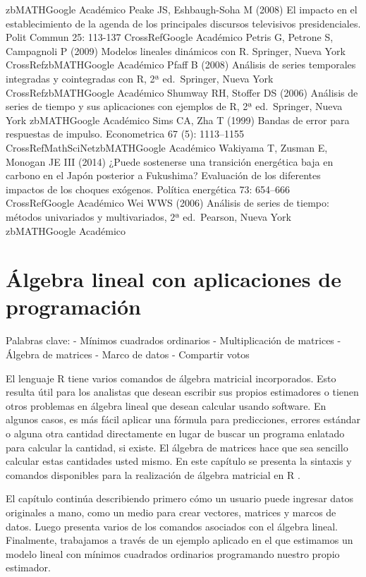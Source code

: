 \documentclass[
]{book}
\begin{document}
zbMATHGoogle Académico
Peake JS, Eshbaugh-Soha M (2008) El impacto en el establecimiento de la agenda de los principales discursos televisivos presidenciales. Polit Commun 25: 113-137
CrossRefGoogle Académico
Petris G, Petrone S, Campagnoli P (2009) Modelos lineales dinámicos con R. Springer, Nueva York
CrossRefzbMATHGoogle Académico
Pfaff B (2008) Análisis de series temporales integradas y cointegradas con R, 2ª ed.~Springer, Nueva York
CrossRefzbMATHGoogle Académico
Shumway RH, Stoffer DS (2006) Análisis de series de tiempo y sus aplicaciones con ejemplos de R, 2ª ed.~Springer, Nueva York
zbMATHGoogle Académico
Sims CA, Zha T (1999) Bandas de error para respuestas de impulso. Econometrica 67 (5): 1113--1155
CrossRefMathSciNetzbMATHGoogle Académico
Wakiyama T, Zusman E, Monogan JE III (2014) ¿Puede sostenerse una transición energética baja en carbono en el Japón posterior a Fukushima? Evaluación de los diferentes impactos de los choques exógenos. Política energética 73: 654--666
CrossRefGoogle Académico
Wei WWS (2006) Análisis de series de tiempo: métodos univariados y multivariados, 2ª ed.~Pearson, Nueva York
zbMATHGoogle Académico

\hypertarget{uxc1lgebralinealconaplicacionesdeprogramaciuxf3n}{%
\chapter{Álgebra lineal con aplicaciones de programación}\label{uxc1lgebralinealconaplicacionesdeprogramaciuxf3n}}

Palabras clave:
- Mínimos cuadrados ordinarios
- Multiplicación de matrices
- Álgebra de matrices
- Marco de datos
- Compartir votos

El lenguaje R tiene varios comandos de álgebra matricial incorporados. Esto resulta útil para los analistas que desean escribir sus propios estimadores o tienen otros problemas en álgebra lineal que desean calcular usando software. En algunos casos, es más fácil aplicar una fórmula para predicciones, errores estándar o alguna otra cantidad directamente en lugar de buscar un programa enlatado para calcular la cantidad, si existe. El álgebra de matrices hace que sea sencillo calcular estas cantidades usted mismo. En este capítulo se presenta la sintaxis y comandos disponibles para la realización de álgebra matricial en R .

El capítulo continúa describiendo primero cómo un usuario puede ingresar datos originales a mano, como un medio para crear vectores, matrices y marcos de datos. Luego presenta varios de los comandos asociados con el álgebra lineal. Finalmente, trabajamos a través de un ejemplo aplicado en el que estimamos un modelo lineal con mínimos cuadrados ordinarios programando nuestro propio estimador.
\end{document}
